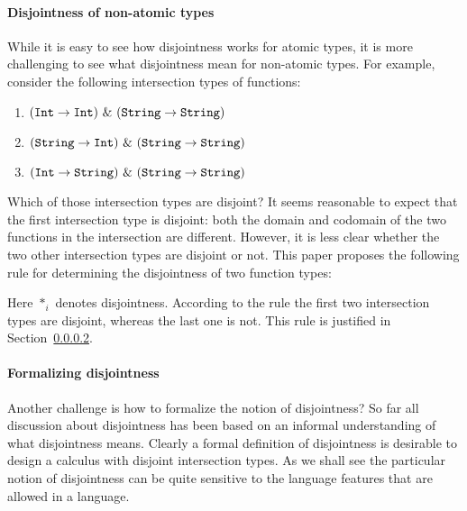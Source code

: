 \paragraph{Disjointness of non-atomic types} 
While it is easy to see how disjointness works for atomic types, 
it is more challenging to see what disjointness mean for non-atomic types.
For example, consider the following intersection types of functions:

\begin{enumerate}

\item $(\code{Int} \to \code{Int})~\inter~(\code{String} \to \code{String})$
\item $(\code{String} \to \code{Int})~\inter~(\code{String} \to \code{String})$
\item $(\code{Int} \to \code{String})~\inter~(\code{String} \to \code{String})$

\end{enumerate}

\noindent Which of those intersection types are disjoint? 
It seems reasonable to expect that the first intersection type is
disjoint: both the domain and codomain of the two functions in the
intersection are different. However, it is less clear whether the two
other intersection types are disjoint or not. This paper proposes the 
following rule for determining the disjointness of two function types:

\begin{mathpar}
\end{mathpar}

\noindent Here $*_i$ denotes disjointness. According to the rule the first 
two intersection types are disjoint, whereas the last one is not. This 
rule is justified in Section~\ref{}. 

\paragraph{Formalizing disjointness} Another challenge is how to formalize 
the notion of disjointness? So far all discussion about disjointness has been 
based on an informal understanding of what disjointness means. Clearly a formal 
definition of disjointness is desirable to design a calculus with disjoint 
intersection types. As we shall see the particular notion of disjointness can be 
quite sensitive to the language features that are allowed in a language. 



